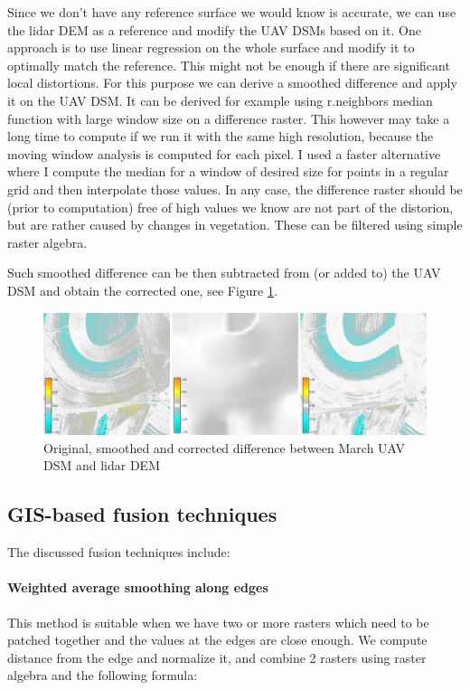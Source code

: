 \documentclass[a4paper,10pt]{article}
\begin{document}
Since we don't have any reference surface we would know is accurate, we can use the lidar DEM as
a reference and modify the UAV DSMs based on it. One approach is to use linear regression
on the whole surface and modify it to optimally match the reference.
This might not be enough if there are significant local distortions.
For this purpose we can derive a smoothed difference and apply it on the UAV DSM.
It can be derived for example using r.neighbors median function with large window size on a difference raster.
This however may take a long time to compute if we run it with the same high resolution,
because the moving window analysis is computed for each pixel.
I used a faster alternative where I compute the median for a window of desired size 
for points in a regular grid and then interpolate those values.
In any case, the difference raster should be (prior to computation) free of high values we know are not part of the distorion,
but are rather caused by changes in vegetation. These can be filtered using simple raster algebra.

Such smoothed difference can be then subtracted from (or added to) the UAV DSM and obtain the corrected one,
see Figure \ref{fig:distortion}.

\begin{figure}
	\centering
        \includegraphics[width=\textwidth]{img/distortion.png}
	\caption{Original, smoothed and corrected difference between March UAV DSM and lidar DEM}
	\label{fig:distortion}
\end{figure}

\subsection*{GIS-based fusion techniques}
The discussed fusion techniques include:

\paragraph*{Weighted average smoothing along edges}
This method is suitable when we have two or more rasters which need to be patched together
and the values at the edges are close enough. We compute distance from the edge and normalize it,
and combine 2 rasters using raster algebra and the following formula:
\end{document}
